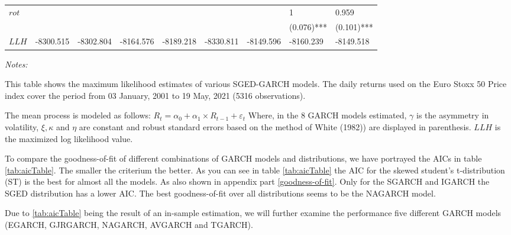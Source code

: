 \documentclass[a4paper, twoside]{templates/ociamthesis}
\begin{document}
\begin{landscape}
\begin{table}
\begin{threeparttable}
{\begin{tabular}[t]{lllllllll}
$rot$ &  &  &  &  &  &  & 1 & 0.959\\
 &  &  &  &  &  &  & (0.076)*** & (0.101)***\\
\addlinespace
$LLH$ & -8300.515 & -8302.804 & -8164.576 & -8189.218 & -8330.811 & -8149.596 & -8160.239 & -8149.518\\
\bottomrule
\end{tabular}}
\begin{tablenotes}
\item \textit{Notes:} 
\item This table shows the maximum likelihood estimates of various SGED-GARCH models. The daily returns used on the Euro Stoxx 50 Price index cover the period from 03 January, 2001 to 19 May, 2021 (5316 observations).
\item The mean process is modeled as follows: $R_t= \alpha_0+ \alpha_1 \times R_{t-1}+ \varepsilon_t$ Where, in the 8 GARCH models estimated, $\gamma$ is the asymmetry in volatility, $\xi, \kappa$ and $\eta$ are constant and robust standard errors based on the method of White (1982)) are displayed in parenthesis. $LLH$ is the maximized log likelihood value.
\end{tablenotes}
\end{threeparttable}
\end{table}
\end{landscape}

\clearpage
\newpage

\noindent To compare the goodness-of-fit of different combinations of GARCH models and distributions, we have portrayed the AICs in table \ref{tab:aicTable}. The smaller the criterium the better. As you can see in table \ref{tab:aicTable} the AIC for the skewed student's t-distribution (ST) is the best for almost all the models. As also shown in appendix part \ref{goodness-of-fit}. Only for the SGARCH and IGARCH the SGED distribution has a lower AIC. The best goodness-of-fit over all distributions seems to be the NAGARCH model.

\noindent  Due to \ref{tab:aicTable} being the result of an in-sample estimation, we will further examine the performance five different GARCH models (EGARCH, GJRGARCH, NAGARCH, AVGARCH and TGARCH).
\end{document}
